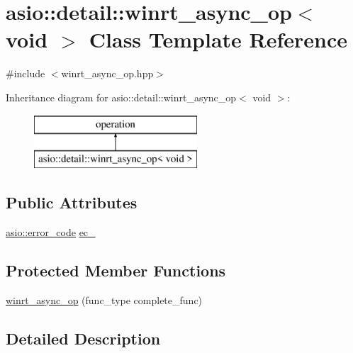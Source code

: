 \hypertarget{classasio_1_1detail_1_1winrt__async__op_3_01void_01_4}{}\section{asio\+:\+:detail\+:\+:winrt\+\_\+async\+\_\+op$<$ void $>$ Class Template Reference}
\label{classasio_1_1detail_1_1winrt__async__op_3_01void_01_4}


{\ttfamily \#include $<$winrt\+\_\+async\+\_\+op.\+hpp$>$}

Inheritance diagram for asio\+:\+:detail\+:\+:winrt\+\_\+async\+\_\+op$<$ void $>$\+:\begin{figure}[H]
\begin{center}
\leavevmode
\includegraphics[height=2.000000cm]{classasio_1_1detail_1_1winrt__async__op_3_01void_01_4}
\end{center}
\end{figure}
\subsection*{Public Attributes}
\begin{DoxyCompactItemize}
\item 
\hyperlink{classasio_1_1error__code}{asio\+::error\+\_\+code} \hyperlink{classasio_1_1detail_1_1winrt__async__op_3_01void_01_4_aad658595d15bf780e9c971f3f0db31a3}{ec\+\_\+}
\end{DoxyCompactItemize}
\subsection*{Protected Member Functions}
\begin{DoxyCompactItemize}
\item 
\hyperlink{classasio_1_1detail_1_1winrt__async__op_3_01void_01_4_a2f5ec7d4b733adcd43a06574e4143110}{winrt\+\_\+async\+\_\+op} (func\+\_\+type complete\+\_\+func)
\end{DoxyCompactItemize}


\subsection{Detailed Description}
